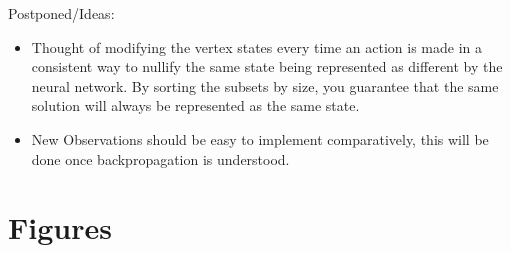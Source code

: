 \documentclass{article}
\begin{document}
Postponed/Ideas:

\begin{itemize}
    \item Thought of modifying the vertex states every time an action is made in a consistent way to nullify the same state being represented as different by the neural network. By sorting the subsets by size, you guarantee that the same solution will always be represented as the same state. 
    \item New Observations should be easy to implement comparatively, this will be done once backpropagation is understood.
\end{itemize}



\clearpage
\section{Figures}


\end{document}
